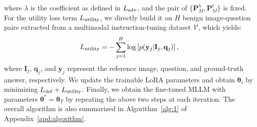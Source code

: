 where $\lambda$ is the coefficient as defined in $L_{\rm adv}$, and the pair of $\{\mathbf{P}_{M}^h,\mathbf{P}_{M}^t\}$ is fixed. For the utility loss term $L_{\rm utility}$, we directly build it on $H$ benign image-question pairs extracted from a multimodal instruction-tuning dataset $\mathcal{V}$, which yields: 
\begin{equation}\label{eq:6}
   L_{\rm utility} =-\sum_{j=1}^{H}\log\left[p(\mathbf{y}_{j}|\mathbf{I}_{j},\mathbf{q}_j)\right], 
\end{equation}
where $\mathbf{I}_j$, $\mathbf{q}_j$, and $\mathbf{y}_j$ represent the reference image, question, and ground-truth answer, respectively. We update the trainable LoRA parameters and obtain $\boldsymbol\theta_i$ by minimizing $L_{\rm def}+L_{\rm utility}$. Finally, we obtain the fine-tuned MLLM with parameters $\boldsymbol\theta^{*}=\boldsymbol\theta_{T}$ by repeating the above two steps at each iteration. The overall algorithm is also summarized in Algorithm~\ref{alg:1} of Appendix~\ref{apd:algorithm}.







